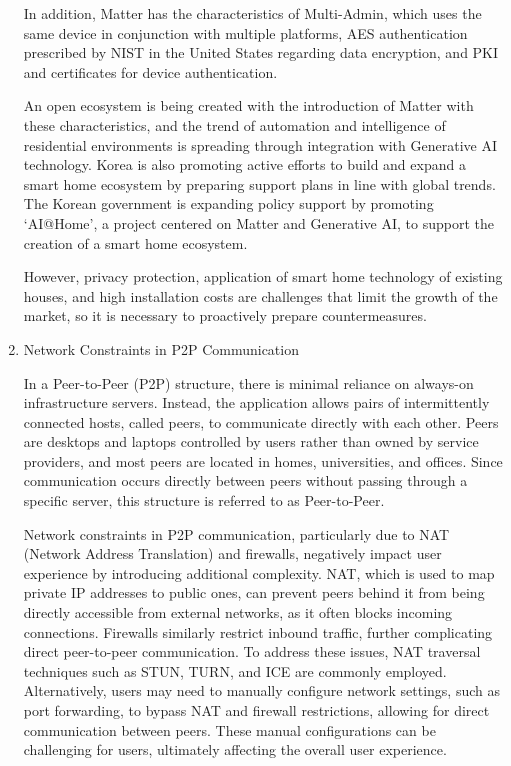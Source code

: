 \documentclass[conference]{IEEEtran}
\begin{document}
\begin{enumerate}[itemsep=2ex, parsep=1ex]
	      In addition, Matter has the characteristics of Multi-Admin, which uses the
	      same device in conjunction with multiple platforms, AES authentication prescribed
	      by NIST in the United States regarding data encryption, and PKI and
	      certificates for device authentication.
	      	      
	      An open ecosystem is being created with the introduction of Matter with
	      these characteristics, and the trend of automation and intelligence of residential
	      environments is spreading through integration with Generative AI technology.
	      Korea is also promoting active efforts to build and expand a smart home
	      ecosystem by preparing support plans in line with global trends. The Korean
	      government is expanding policy support by promoting `AI@Home', a project
	      centered on Matter and Generative AI, to support the creation of a smart home
	      ecosystem.
	      	      
	      However, privacy protection, application of smart home technology of existing
	      houses, and high installation costs are challenges that limit the growth
	      of the market, so it is necessary to proactively prepare countermeasures.
	      	      
	\item Network Constraints in P2P Communication
	      	      
	      In a Peer-to-Peer (P2P) structure, there is minimal reliance on always-on infrastructure
	      servers. Instead, the application allows pairs of intermittently connected
	      hosts, called peers, to communicate directly with each other. Peers are
	      desktops and laptops controlled by users rather than owned by service
	      providers, and most peers are located in homes, universities, and offices.
	      Since communication occurs directly between peers without passing through
	      a specific server, this structure is referred to as Peer-to-Peer.
	      	      
	      Network constraints in P2P communication, particularly due to NAT (Network
	      Address Translation) and firewalls, negatively impact user experience by introducing
	      additional complexity. NAT, which is used to map private IP addresses to public
	      ones, can prevent peers behind it from being directly accessible from
	      external networks, as it often blocks incoming connections. Firewalls
	      similarly restrict inbound traffic, further complicating direct peer-to-peer
	      communication. To address these issues, NAT traversal techniques such as STUN,
	      TURN, and ICE are commonly employed. Alternatively, users may need to manually
	      configure network settings, such as port forwarding, to bypass NAT and firewall
	      restrictions, allowing for direct communication between peers. These manual
	      configurations can be challenging for users, ultimately affecting the
	      overall user experience.
	      	      

\end{enumerate}
\end{document}
